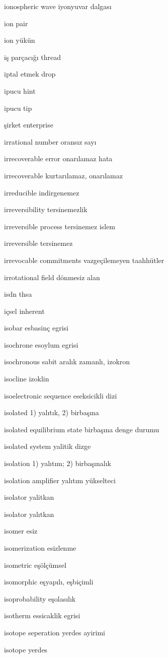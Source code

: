 \documentclass[12pt,fleqn]{article}\usepackage{../../common}
\begin{document}
ionospheric wave iyonyuvar dalgası

ion pair

ion yükün

iş parçacığı thread

iptal etmek drop

ipucu hint

ipucu tip

şirket enterprise

irrational number oransız sayı

irrecoverable error onarılamaz hata

irrecoverable kurtarılamaz, onarılamaz

irreducible indirgenemez

irreversibility tersinemezlik

irreversible process tersinemez islem

irreversible tersinemez

irrevocable commitments vazgeçilemeyen taahhütler

irrotational field dönmesiz alan

isdn thsa

içsel inherent

isobar esbasinç egrisi

isochrone esoylum egrisi

isochronous sabit aralık zamanlı, izokron

isocline izoklin

isoelectronic sequence eseksicikli dizi

isolated 1) yalıtık, 2) birbaşına

isolated equilibrium state birbaşına denge durumu

isolated system yalitik dizge

isolation 1) yalıtım; 2) birbaşınalık

isolation amplifier yalıtım yükselteci

isolator yalitkan

isolator yalıtkan

isomer esiz

isomerization esizlenme

isometric eşölçümsel

isomorphic eşyapılı, eşbiçimli

isoprobability eşolasılık

isotherm essicaklik egrisi

isotope seperation yerdes ayirimi

isotope yerdes
\end{document}
